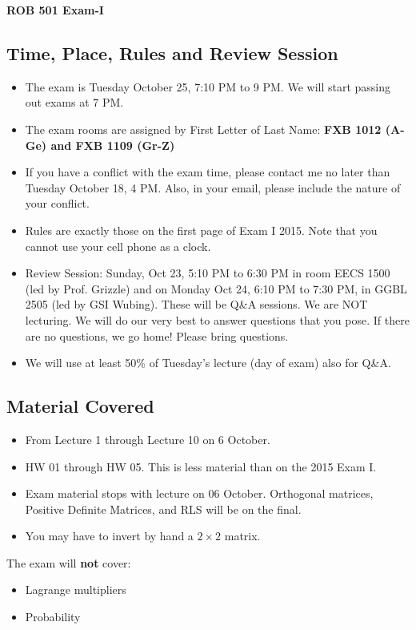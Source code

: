 \documentclass[letterpaper]{article}
\begin{document}
\vspace*{.1in}
\begin{center}
\LARGE \bf
ROB 501 Exam-I \\
\end{center}

\vspace*{1cm}

\subsection*{Time, Place, Rules and Review Session}

\begin{itemize}
\item The exam is Tuesday October 25, 7:10 PM to 9 PM. We will start passing out exams at 7 PM.
\item The exam rooms are assigned by First Letter of Last Name: \textbf{FXB 1012 (A-Ge) and FXB 1109 (Gr-Z)}
\item If you have a conflict with the exam time, please contact me no later than Tuesday October 18, 4 PM. Also, in your email, please include the nature of your conflict.
\item Rules are exactly those on the first page of Exam I 2015. Note that you cannot use your cell phone as a clock.
\item Review Session: Sunday, Oct 23, 5:10 PM to 6:30 PM in room EECS 1500 (led by Prof. Grizzle) and on Monday Oct 24,  6:10 PM to 7:30 PM, in GGBL 2505 (led by GSI Wubing). These will be Q\&A sessions. We are NOT lecturing. We will do our very best to answer questions that you pose. If there are no questions, we go home! Please bring questions.
    \item We will use at least 50\% of Tuesday's lecture (day of exam) also for Q\&A.
\end{itemize}

\subsection*{Material Covered}

\begin{itemize}
\item From Lecture 1 through Lecture 10 on 6 October.
\item HW 01 through HW 05. This is less material than on the 2015 Exam I.
\item Exam material stops with lecture on 06 October. Orthogonal matrices, Positive Definite Matrices, and RLS will be on the final.
\item You may have to invert by hand a $2 \times 2$ matrix.
\end{itemize}
The exam will \textbf{not} cover:
\begin{itemize}
\item Lagrange multipliers
\item Probability
\end{itemize}
\end{document}
